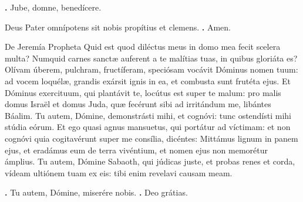 \begin{small}
\textbf{\Vbar.} Jube, domne, benedícere.

Deus Pater omnípotens sit nobis propítius et clemens. \textbf{\Rbar.} Amen.
\end{small}


De Jeremía Propheta
Quid est quod diléctus meus in domo mea fecit scelera multa? Numquid carnes sanctæ auferent a te malítias tuas, in quibus gloriáta es?
Olívam úberem, pulchram, fructíferam, speciósam vocávit Dóminus nomen tuum: ad vocem loquélæ, grandis exársit ignis in ea, et combusta sunt frutéta ejus.
Et Dóminus exercituum, qui plantávit te, locútus est super te malum: pro malis domus Israël et domus Juda, quæ fecérunt sibi ad irritándum me, libántes Báalim.
Tu autem, Dómine, demonstrásti mihi, et cognóvi: tunc ostendísti mihi stúdia eórum.
Et ego quasi agnus mansuetus, qui portátur ad víctimam: et non cognóvi quia cogitavérunt super me consília, dicéntes: Mittámus lignum in panem ejus, et eradámus eum de terra vivéntium, et nomen ejus non memorétur ámplius.
Tu autem, Dómine Sabaoth, qui júdicas juste, et probas renes et corda, vídeam ultiónem tuam ex eis: tibi enim revelavi causam meam.

\textbf{\Vbar.} Tu autem, Dómine, miserére nobis.
\textbf{\Rbar.} Deo grátias.

